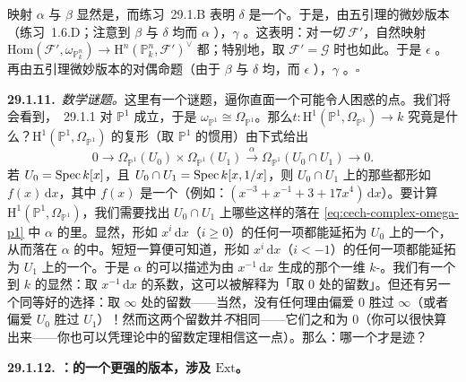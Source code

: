 映射 $\alpha$ 与 $\beta$ 显然是\trIsomorphism，而\mbox{练习~29.1.B} 表明 $\delta$ 是一个\trIsomorphism。于是，由五引理的微妙版本（\mbox{练习~1.6.D}；注意到 $\beta$ 与 $\delta$ 均\trInjectiveMap{}而 $\alpha$ \trSurjectiveMap），$\gamma$ \trInjectiveMap。这表明：对\emph{一切}\trCoherentSheaf{} $\mathscr{F}'$，自然映射 $\mathrm{Hom}(\mathscr{F}',\omega_{\mathbb{P}^n_k})\to\mathrm{H}^n(\mathbb{P}^n_k,\mathscr{F}')^{\vee}$ 都\trInjectiveMap；特别地，取 $\mathscr{F}'=\mathscr{G}$ 时也如此。于是 $\epsilon$ \trInjectiveMap。再由五引理微妙版本的对偶命题（由于 $\beta$ 与 $\delta$ 均\trSurjectiveMap，而 $\epsilon$ \trInjectiveMap），$\gamma$ \trSurjectiveMap。\hfill$\square$

\textbf{29.1.11.}\ \emph{数学谜题。}\quad 这里有一个谜题，逼你直面一个可能令人困惑的点。我们将会看到，\mbox{\trDesideratum{}~29.1.1} 对 $\mathbb{P}^1$ 成立，于是 $\omega_{\mathbb{P}^1}\cong\Omega_{\mathbb{P}^1}$。那么\trTraceMap $t\colon\mathrm{H}^1(\mathbb{P}^1,\Omega_{\mathbb{P}^1})\to k$ 究竟是什么？$\mathrm{H}^1(\mathbb{P}^1,\Omega_{\mathbb{P}^1})$ 的\trCech{}复形（取 $\mathbb{P}^1$ 的惯用\trCover）由下式给出
\begin{equation*}\tag{29.1.11.1}\label{eq:cech-complex-omega-p1}
0\longrightarrow\Omega_{\mathbb{P}^1}(U_0)\times\Omega_{\mathbb{P}^1}(U_1)\overset{\alpha}{\longrightarrow}\Omega_{\mathbb{P}^1}(U_0\cap U_1)\longrightarrow 0.
\end{equation*}
若 $U_0=\operatorname{Spec} k[x]$，且 $U_0\cap U_1=\operatorname{Spec} k[x,1/x]$，则 $U_0\cap U_1$ 上的那些\trDifferential{}都形如 $f(x)\,\mathrm{d}x$，其中 $f(x)$ 是一个\trLaurentPolynomial（例如：$(x^{-3}+x^{-1}+3+17x^4)\,\mathrm{d}x$）。要计算 $\mathrm{H}^1(\mathbb{P}^1,\Omega_{\mathbb{P}^1})$，我们需要找出 $U_0\cap U_1$ 上哪些这样的\trDifferential{}落在 \eqref{eq:cech-complex-omega-p1} 中 $\alpha$ 的\trImage{}里。显然，形如 $x^i\,\mathrm{d}x$（$i\ge 0$）的任何一项都能延拓为 $U_0$ 上的一个\trDifferential，从而落在 $\alpha$ 的\trImage{}中。短短一算便可知道，形如 $x^i\,\mathrm{d}x$（$i<-1$）的任何一项都能延拓为 $U_1$ 上的一个\trDifferential。于是 $\alpha$ 的\trCokernel{}可以描述为由 $x^{-1}\,\mathrm{d}x$ 生成的那个一维 $k$-\trVectorSpace。我们有一个到 $k$ 的显然\trIsomorphism：取 $x^{-1}\,\mathrm{d}x$ 的系数，这可以被解释为「取 $0$ 处的留数」。但还有另一个同等好的选择：取 $\infty$ 处的留数——当然，没有任何理由偏爱 $0$ 胜过 $\infty$（或者偏爱 $U_0$ 胜过 $U_1$）！然而这两个留数并\emph{不}相同——它们之和为 $0$（你可以很快算出来——你也可以凭\trRiemannSurface{}理论中的留数定理相信这一点）。那么：哪一个才是迹？

\textbf{29.1.12. \trDesideratum{}：\trDuality{}的一个更强的版本，涉及 $\mathrm{Ext}$。}


